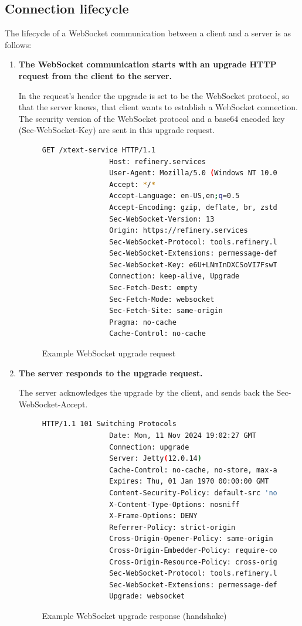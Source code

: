 	\subsection{Connection lifecycle}
		The lifecycle of a WebSocket communication between a client and a server is as follows:
		\begin{enumerate}
			\item \textbf{The WebSocket communication starts with an upgrade HTTP request from the client to the server.}
			
			In the request's header the upgrade is set to be the WebSocket protocol, so that the server knows, that client wants to establish a WebSocket connection.
			The security version of the WebSocket protocol and a base64 encoded key (Sec-WebSocket-Key) are sent in this upgrade request. 
			\begin{figure}[h!]
				\begin{lstlisting}[language=bash]
				GET /xtext-service HTTP/1.1
				Host: refinery.services
				User-Agent: Mozilla/5.0 (Windows NT 10.0; Win64; x64; rv:132.0) Gecko/20100101 Firefox/132.0
				Accept: */*
				Accept-Language: en-US,en;q=0.5
				Accept-Encoding: gzip, deflate, br, zstd
				Sec-WebSocket-Version: 13
				Origin: https://refinery.services
				Sec-WebSocket-Protocol: tools.refinery.language.web.xtext.v1
				Sec-WebSocket-Extensions: permessage-deflate
				Sec-WebSocket-Key: e6U+LNmInDXCSoVI7FswTQ==
				Connection: keep-alive, Upgrade
				Sec-Fetch-Dest: empty
				Sec-Fetch-Mode: websocket
				Sec-Fetch-Site: same-origin
				Pragma: no-cache
				Cache-Control: no-cache
				\end{lstlisting}
				\caption{Example WebSocket upgrade request}
			\end{figure}

			\item  \textbf{The server responds to the upgrade request.}

			The server acknowledges the upgrade by the client, and sends back the Sec-WebSocket-Accept.
			\begin{figure}[h!]
				\begin{lstlisting}[language=bash]
				HTTP/1.1 101 Switching Protocols
				Date: Mon, 11 Nov 2024 19:02:27 GMT
				Connection: upgrade
				Server: Jetty(12.0.14)
				Cache-Control: no-cache, no-store, max-age: 0, must-revalidate
				Expires: Thu, 01 Jan 1970 00:00:00 GMT
				Content-Security-Policy: default-src 'none'; script-src 'self' 'wasm-unsafe-eval'; style-src 'self' 'unsafe-inline'; img-src 'self' data: blob:; font-src 'self'; connect-src 'self' data:; manifest-src 'self'; worker-src 'self' blob:;
				X-Content-Type-Options: nosniff
				X-Frame-Options: DENY
				Referrer-Policy: strict-origin
				Cross-Origin-Opener-Policy: same-origin
				Cross-Origin-Embedder-Policy: require-corp
				Cross-Origin-Resource-Policy: cross-origin
				Sec-WebSocket-Protocol: tools.refinery.language.web.xtext.v1
				Sec-WebSocket-Extensions: permessage-deflate
				Upgrade: websocket
				\end{lstlisting}
				\caption{Example WebSocket upgrade response (handshake)}
			\end{figure}


\end{enumerate}
